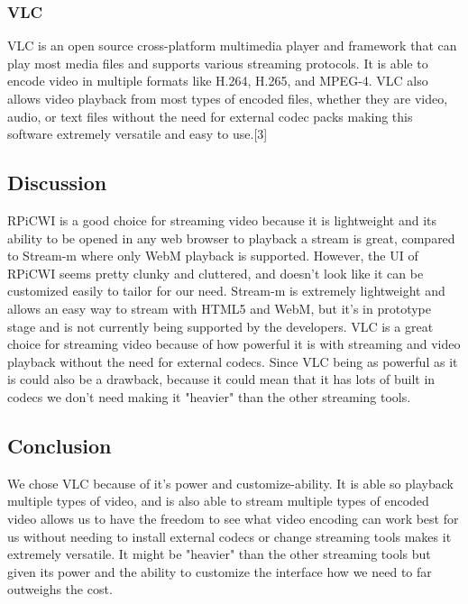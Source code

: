 \documentclass[onecolumn, draftclsnofoot,10pt, compsoc]{IEEEtran}
\begin{document}
\subsubsection{VLC}
VLC is an open source cross-platform multimedia player and framework that can play most media files and supports various streaming protocols. It is able to encode video in multiple formats like H.264, H.265, and MPEG-4. VLC also allows video playback from most types of encoded files, whether they are video, audio, or text files without the need for external codec packs making this software extremely versatile and easy to use.[3]




\subsection{Discussion}
RPiCWI is a good choice for streaming video because it is lightweight and its ability to be opened in any web browser to playback a stream is great, compared to Stream-m where only WebM playback is supported. However, the UI of RPiCWI seems pretty clunky and cluttered, and doesn't look like it can be customized easily to tailor for our need. Stream-m is extremely lightweight and allows an easy way to stream with HTML5 and WebM, but it's in prototype stage and is not currently being supported by the developers. VLC is a great choice for streaming video because of how powerful it is with streaming and video playback without the need for external codecs. Since VLC being as powerful as it is could also be a drawback, because it could mean that it has lots of built in codecs we don't need making it "heavier" than the other streaming tools.




\subsection{Conclusion}
We chose VLC because of it's power and customize-ability. It is able so playback multiple types of video, and is also able to stream multiple types of encoded video allows  us to have the freedom to see what video encoding can work best for us without needing to install external codecs or change streaming tools makes it extremely versatile. It might be "heavier" than the other streaming tools but given its power and the ability to customize the interface how we need to far outweighs the cost.
\end{document}
